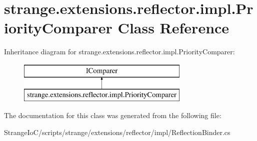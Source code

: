 \hypertarget{classstrange_1_1extensions_1_1reflector_1_1impl_1_1_priority_comparer}{\section{strange.\-extensions.\-reflector.\-impl.\-Priority\-Comparer Class Reference}
\label{classstrange_1_1extensions_1_1reflector_1_1impl_1_1_priority_comparer}
}
Inheritance diagram for strange.\-extensions.\-reflector.\-impl.\-Priority\-Comparer\-:\begin{figure}[H]
\begin{center}
\leavevmode
\includegraphics[height=2.000000cm]{classstrange_1_1extensions_1_1reflector_1_1impl_1_1_priority_comparer}
\end{center}
\end{figure}


The documentation for this class was generated from the following file\-:\begin{DoxyCompactItemize}
\item 
Strange\-Io\-C/scripts/strange/extensions/reflector/impl/Reflection\-Binder.\-cs\end{DoxyCompactItemize}
